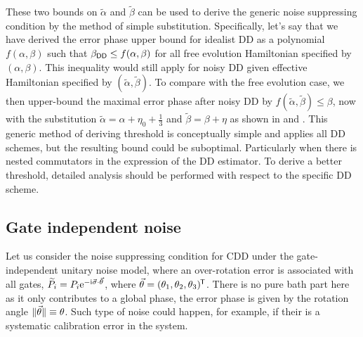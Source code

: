 \documentclass[aps,pra,reprint,superscriptaddress]{revtex4-2}
\newcommand{\alphat}{\widetilde{\alpha}}
\newcommand{\betat}{\widetilde{\beta}}
\begin{document}
These two bounds on $\alphat$ and $\betat$ can be used to derive the generic noise suppressing condition by the method of simple substitution.  Specifically, let's say that we have derived the error phase upper bound for idealist DD as a polynomial $f(\alpha,\beta)$ such that $\beta_{\mathsf{DD}} \le f(\alpha,\beta)$ for all free evolution Hamiltonian specified by $(\alpha,\beta)$.  
This inequality would still apply for noisy DD 
given effective Hamiltonian specified by $(\widetilde\alpha,\widetilde\beta)$.
To compare with the free evolution case, we then upper-bound the maximal error phase after noisy DD by $f(\widetilde\alpha,\widetilde\beta) \le \beta$, now with the substitution $\alphat=\alpha+\eta_0+ \frac{1}{3}$ and 
$\betat =\beta + \eta$ as shown in  and .
This generic method of deriving threshold is conceptually simple and applies all DD schemes, but the resulting bound could be suboptimal.
Particularly when there is nested commutators in the expression of the DD estimator. To derive a better threshold, detailed analysis should be performed with respect to the specific DD scheme. 



\subsection{Gate independent noise}


Let us consider the noise suppressing condition for CDD 
under the gate-independent unitary noise model, where an over-rotation error is associated with all gates, $\widetilde{P}_i = P_i \mathrm{e}^{-\mathrm{i} \vec{\sigma} \cdot\vec{\theta}}$, where $\vec{\theta} = (\theta_1,\theta_2, \theta_3)^{\mkern-1.5mu\mathsf{T}}$.
There is no pure bath part here as it only contributes to a global phase, the error phase is given by the rotation angle $\Vert {\vec{\theta}} \Vert\equiv\theta$.
Such type of noise could happen, for example, if their is a systematic calibration error in the system.
\end{document}
